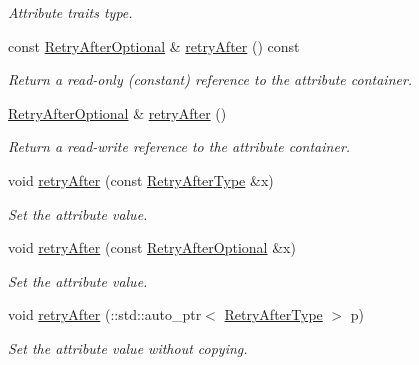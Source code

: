 \begin{DoxyCompactItemize}
\begin{DoxyCompactList}\small\item\em Attribute traits type. \item\end{DoxyCompactList}\item 
const \hyperlink{classopenstack_1_1xml_1_1OverLimitAPIFault_a734c2f2998f73b722135849bebd65dd1}{RetryAfterOptional} \& \hyperlink{classopenstack_1_1xml_1_1OverLimitAPIFault_a0c0344385937c8d4cbaf9bcc707ba995}{retryAfter} () const 
\begin{DoxyCompactList}\small\item\em Return a read-\/only (constant) reference to the attribute container. \item\end{DoxyCompactList}\item 
\hyperlink{classopenstack_1_1xml_1_1OverLimitAPIFault_a734c2f2998f73b722135849bebd65dd1}{RetryAfterOptional} \& \hyperlink{classopenstack_1_1xml_1_1OverLimitAPIFault_a0fdd37390d0a051256d6fe5cb8ce9e0e}{retryAfter} ()
\begin{DoxyCompactList}\small\item\em Return a read-\/write reference to the attribute container. \item\end{DoxyCompactList}\item 
void \hyperlink{classopenstack_1_1xml_1_1OverLimitAPIFault_a5e0a004148e0ca922d6078542b58e795}{retryAfter} (const \hyperlink{classopenstack_1_1xml_1_1OverLimitAPIFault_a6cb6485a20a69f6af02b43e708d56053}{RetryAfterType} \&x)
\begin{DoxyCompactList}\small\item\em Set the attribute value. \item\end{DoxyCompactList}\item 
void \hyperlink{classopenstack_1_1xml_1_1OverLimitAPIFault_a4124a0f25f6eace9f443551695280d23}{retryAfter} (const \hyperlink{classopenstack_1_1xml_1_1OverLimitAPIFault_a734c2f2998f73b722135849bebd65dd1}{RetryAfterOptional} \&x)
\begin{DoxyCompactList}\small\item\em Set the attribute value. \item\end{DoxyCompactList}\item 
void \hyperlink{classopenstack_1_1xml_1_1OverLimitAPIFault_add8b66b5f56aabdfa5a81733d5cf1445}{retryAfter} (::std::auto\_\-ptr$<$ \hyperlink{classopenstack_1_1xml_1_1OverLimitAPIFault_a6cb6485a20a69f6af02b43e708d56053}{RetryAfterType} $>$ p)
\begin{DoxyCompactList}\small\item\em Set the attribute value without copying. \item\end{DoxyCompactList}\end{DoxyCompactItemize}
